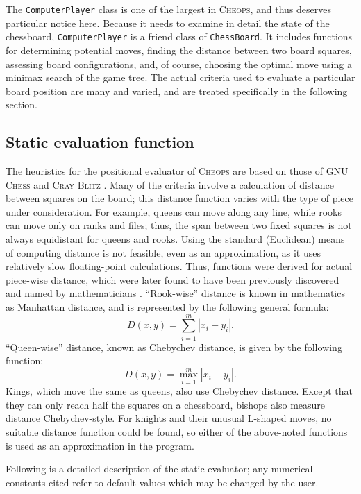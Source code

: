 \documentclass[12pt]{article}
\begin{document}
The \texttt{ComputerPlayer} class is one of the largest in
\textsc{Cheops}, and thus deserves particular notice here. Because it
needs to examine in detail the state of the chessboard,
\texttt{ComputerPlayer} is a friend class of \texttt{ChessBoard}. It
includes functions for determining potential moves, finding the
distance between two board squares, assessing board configurations,
and, of course, choosing the optimal move using a minimax search of
the game tree. The actual criteria used to evaluate a particular board
position are many and varied, and are treated specifically in the
following section.

\subsection{Static evaluation function}

The heuristics for the positional evaluator of \textsc{Cheops} are
based on those of \textsc{GNU Chess} \cite{stanback} and \textsc{Cray
  Blitz} \cite{crayblitz}. Many of the criteria involve a calculation
of distance between squares on the board; this distance function
varies with the type of piece under consideration.  For example,
queens can move along any line, while rooks can move only on ranks and
files; thus, the span between two fixed squares is not always
equidistant for queens and rooks. Using the standard (Euclidean) means
of computing distance is not feasible, even as an approximation, as it
uses relatively slow floating-point calculations.  Thus, functions
were derived for actual piece-wise distance, which were later found to
have been previously discovered and named by mathematicians
\cite{wilson}.  ``Rook-wise'' distance is known in mathematics as
Manhattan distance, and is represented by the following general
formula: \[ D(x, y) = \sum_{i=1}^{m} \left|x_i - y_i\right|. \]
``Queen-wise'' distance, known as Chebychev distance, is given by the
following function: \[ D(x, y) = \max_{i=1}^{m} \left|x_i -
  y_i\right|. \] Kings, which move the same as queens, also use
Chebychev distance. Except that they can only reach half the squares
on a chessboard, bishops also measure distance Chebychev-style. For
knights and their unusual L-shaped moves, no suitable distance
function could be found, so either of the above-noted functions is
used as an approximation in the program.

Following is a detailed description of the static evaluator; any
numerical constants cited refer to default values which may be changed
by the user.
\end{document}
